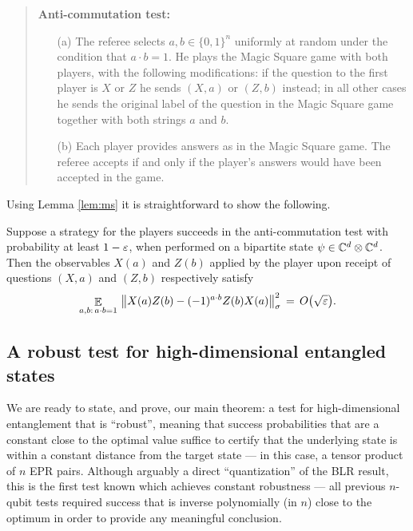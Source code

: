 \begin{quote}
\textbf{Anti-commutation test:}
\begin{itemize}
\item[(a)] The referee selects $a,b\in\{0,1\}^n$ uniformly at random under the condition that $a\cdot b=1$. He plays the Magic Square game with both players, with the following modifications: if the question to the first player is $X$ or $Z$ he sends $(X,a)$ or $(Z,b)$ instead; in all other cases he sends the original label of the question in the Magic Square game together with both strings $a$ and $b$. 
\item[(b)] Each player provides answers as in the Magic Square game. The referee accepts if and only if the player's answers would have been accepted in the game. 
\end{itemize}
\end{quote}

Using Lemma \ref{lem:ms} it is straightforward to show the following. 

\begin{lemma}\label{lem:ac}
Suppose a strategy for the players succeeds in the anti-commutation test with probability at least $1-\varepsilon$, when performed on a bipartite state $\psi \in \mathbb{C}^d \otimes \mathbb{C}^d$. Then the observables $X(a)$ and $Z(b)$ applied by the player upon receipt of questions $(X,a)$ and $(Z,b)$ respectively satisfy 
\begin{equation}\label{eq:ac}
 \mathop{\mathbb{E}}\displaylimits_{a,b:\,a\cdot b=1} \,\big\| X(a)Z(b)-(-1)^{a\cdot b} Z(b)X(a)\big\|_\sigma^2\,=\,O\big(\sqrt{\varepsilon}\big).
\end{equation}
\end{lemma}

\subsection{A robust test for high-dimensional entangled states}

We are ready to state, and prove, our main theorem: a test for high-dimensional entanglement that is ``robust'', meaning that success probabilities that are a constant close to the optimal value suffice to certify that the underlying state is within a constant distance from the target state --- in this case, a tensor product of $n$ EPR pairs. Although arguably a direct ``quantization'' of the BLR result, this is the first test known which achieves constant robustness --- all previous $n$-qubit tests required success that is inverse polynomially (in $n$) close  to the optimum in order to provide any meaningful conclusion.


